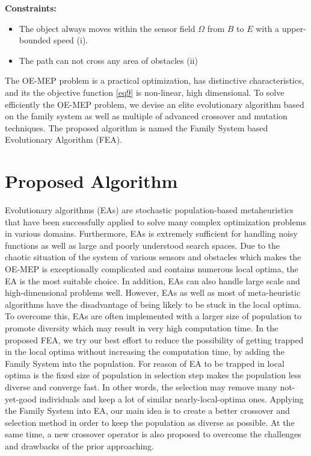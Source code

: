 \documentclass[final]{elsarticle}
\begin{document}
\textbf{Constraints:}	
\begin{itemize}
	\item The object always moves within the sensor field $\Omega $ from $B$ to $E$ with a upper-bounded speed (i).
	\item The path can not cross any area of obstacles  (ii)
\end{itemize}
	
The OE-MEP problem is a practical optimization, has distinctive characteristics, and its the objective function \eqref{eq9} is non-linear, high dimensional. To solve efficiently the OE-MEP problem, we devise an elite evolutionary algorithm based on the family system as well as multiple of advanced crossover and mutation techniques. The proposed algorithm is named the Family System based Evolutionary Algorithm (FEA).

\section{Proposed Algorithm}
Evolutionary algorithms (EAs) are stochastic population-based metaheuristics that have been successfully applied to solve many complex optimization problems in various domains. Furthermore, EAs is extremely sufficient for handling noisy functions as well as large and poorly understood search spaces. Due to the chaotic situation of the system of various sensors and obstacles which makes the OE-MEP is exceptionally complicated and contains numerous local optima, the EA is the most suitable choice. In addition, EAs can also handle large scale and high-dimensional problems well. However, EAs as well as most of meta-heuristic algorithms have the disadvantage of being likely to be stuck in the local optima. To overcome this, EAs are often implemented with a larger size of population to promote diversity which may result in very high computation time. In the proposed FEA, we try our best effort to reduce the possibility of getting trapped in the local optima without increasing the computation time, by adding the Family System into the population. For reason of EA to be trapped in local optima is the fixed size of population in selection step makes the population less diverse and converge fast. In other words, the selection may remove many not-yet-good individuals and keep a lot of similar nearly-local-optima ones. Applying the Family System into EA, our main idea is to create a better crossover and selection method in order to keep the population as diverse as possible. At the same time, a new crossover operator is also proposed to overcome the challenges and drawbacks of the prior approaching.
\end{document}
